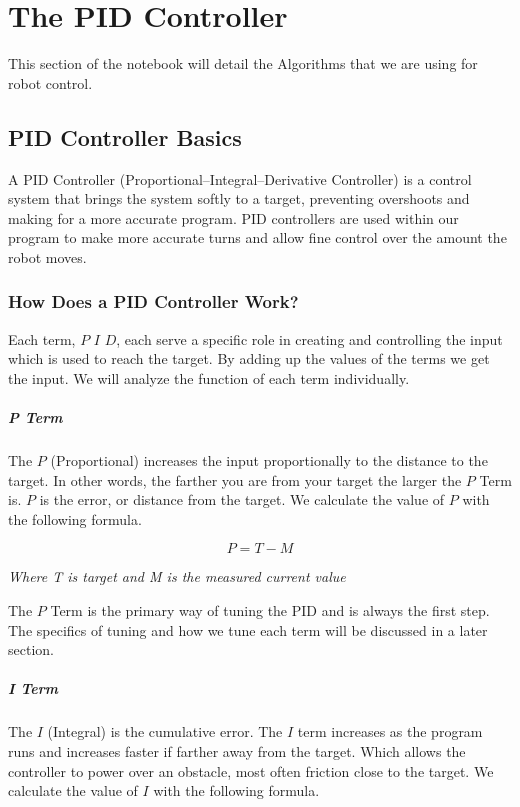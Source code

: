 \documentclass[12pt]{report}
\begin{document}
\chapter{The PID Controller}
This section of the notebook will detail the Algorithms that we are using for robot control.
\section{PID Controller Basics}
    A PID Controller (Proportional–Integral–Derivative Controller) is a control system that brings the system softly to a target,
        preventing overshoots and making for a more accurate program. 
    PID controllers are used within our program to make more accurate turns and allow fine control over the amount the robot moves.

\subsection{How Does a PID Controller Work?} \label{howPID}
    Each term, $P$ $I$ $D$, each serve a specific role in creating and controlling the input which is used to reach the target. 
    By adding up the values of the terms we get the input. We will analyze the function of each term individually.

\paragraph{P Term}
    The $P$ (Proportional) increases the input proportionally to the distance to the target.
    In other words, the farther you are from your target the larger the $P$ Term is. 
    $P$ is the error, or distance from the target. We calculate the value of $P$ with the following formula.

    $$ P = T - M$$
    \begin{center}\em{Where T is target and M is the measured current value}\end{center}

    The $P$ Term is the primary way of tuning the PID and is always the first step.
    The specifics of tuning and how we tune each term will be discussed in a later section.

\paragraph{I Term}
    The $I$ (Integral) is the cumulative error.
    The $I$ term increases as the program runs and increases faster if farther away from the target. 
    Which allows the controller to power over an obstacle, most often friction close to the target.
    We calculate the value of $I$ with the following formula.
\end{document}
